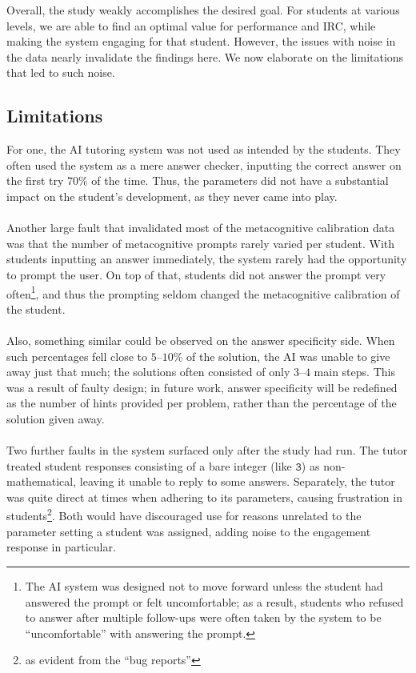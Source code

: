 \documentclass[12pt]{article}
\begin{document}
Overall, the study weakly accomplishes the desired goal. For students at various levels, we are able to find an optimal value for performance and IRC, while making the system engaging for that student. However, the issues with noise in the data nearly invalidate the findings here. We now elaborate on the limitations that led to such noise.

\subsection{Limitations}

For one, the AI tutoring system was not used as intended by the students. They often used the system as a mere answer checker, inputting the correct answer on the first try $70\%$ of the time. Thus, the parameters did not have a substantial impact on the student's development, as they never came into play.
\\\\
Another large fault that invalidated most of the metacognitive calibration data was that the number of metacognitive prompts rarely varied per student. With students inputting an answer immediately, the system rarely had the opportunity to prompt the user. On top of that, students did not answer the prompt very often\footnote{The AI system was designed not to move forward unless the student had answered the prompt or felt uncomfortable; as a result, students who refused to answer after multiple follow-ups were often taken by the system to be ``uncomfortable'' with answering the prompt.}, and thus the prompting seldom changed the metacognitive calibration of the student.
\\\\
Also, something similar could be observed on the answer specificity side. When such percentages fell close to $5$--$10\%$ of the solution, the AI was unable to give away just that much; the solutions often consisted of only $3$--$4$ main steps. This was a result of faulty design; in future work, answer specificity will be redefined as the number of hints provided per problem, rather than the percentage of the solution given away.
\\\\
Two further faults in the system surfaced only after the study had run. The tutor treated student responses consisting of a bare integer (like $\texttt 3$) as non-mathematical, leaving it unable to reply to some answers. Separately, the tutor was quite direct at times when adhering to its parameters, causing frustration in students\footnote{as evident from the ``bug reports''}. Both would have discouraged use for reasons unrelated to the parameter setting a student was assigned, adding noise to the engagement response in particular.
\end{document}
